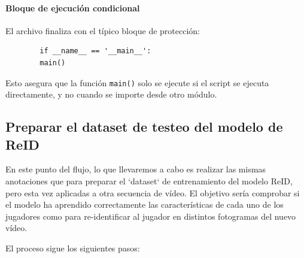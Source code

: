 \documentclass[12pt, a4paper, twoside]{article}
\begin{document}
	\paragraph{Bloque de ejecución condicional}
	
	El archivo finaliza con el típico bloque de protección:
	
	\begin{verbatim}
		if __name__ == '__main__':
		main()
	\end{verbatim}
	
	Esto asegura que la función \texttt{main()} solo se ejecute si el script se ejecuta directamente, y no cuando se importe desde otro módulo.
	
	
	
	\subsection{Preparar el dataset de testeo del modelo de ReID} 
	
	En este punto del flujo, lo que llevaremos a cabo es realizar las mismas anotaciones que para preparar el `dataset` de entrenamiento del modelo ReID, pero esta vez aplicadas a otra secuencia de vídeo. El objetivo sería comprobar si el modelo ha aprendido correctamente las características de cada uno de los jugadores como para re-identificar al jugador en distintos fotogramas del nuevo vídeo.
	
	El proceso sigue los siguientes pasos:
	
\end{document}
